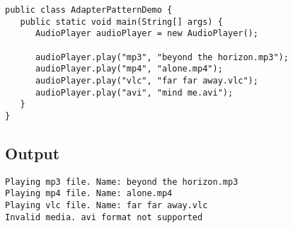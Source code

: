 \begin{verbatim}
public class AdapterPatternDemo {
   public static void main(String[] args) {
      AudioPlayer audioPlayer = new AudioPlayer();

      audioPlayer.play("mp3", "beyond the horizon.mp3");
      audioPlayer.play("mp4", "alone.mp4");
      audioPlayer.play("vlc", "far far away.vlc");
      audioPlayer.play("avi", "mind me.avi");
   }
}
\end{verbatim}

\subsection{Output}

\begin{verbatim}
Playing mp3 file. Name: beyond the horizon.mp3
Playing mp4 file. Name: alone.mp4
Playing vlc file. Name: far far away.vlc
Invalid media. avi format not supported
\end{verbatim}
